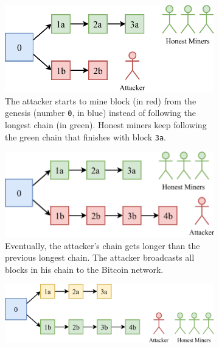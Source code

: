 \begin{figure}[t!]
	\begin{subfigure}{\textwidth}
		\centering
		\vspace*{0.25cm}
		\includegraphics[scale=0.9]{figures/majority_attack_1}
		\vspace*{0.25cm}
		\caption{
			The attacker starts to mine block (in red) from the genesis (number \texttt{0}, in blue) instead of following the longest chain (in green).
			Honest miners keep following the green chain that finishes with block \texttt{3a}.
		}
		\vspace*{0.75cm}
	\end{subfigure}
	\begin{subfigure}{\textwidth}
		\centering
		\vspace*{0.25cm}
		\includegraphics[scale=0.9]{figures/majority_attack_2}
		\vspace*{0.25cm}
		\caption{
			Eventually, the attacker's chain gets longer than the previous longest chain.
			The attacker broadcasts all blocks in his chain to the Bitcoin network.
		}
		\vspace*{0.75cm}
	\end{subfigure}
	\begin{subfigure}{\textwidth}
		\centering
		\vspace*{0.25cm}
		\includegraphics[scale=0.9]{figures/majority_attack_3}

\end{subfigure}
\end{figure}
